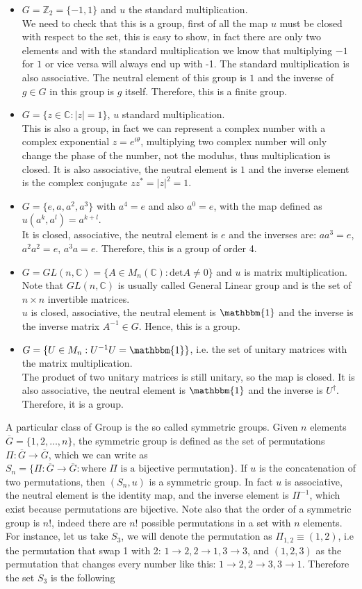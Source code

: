 \documentclass[12pt]{book}
\theoremstyle{plain}
\newcommand{\I}{\mathbbm{1}}
\newcommand{\Z}{\mathbb{Z}}
\newcommand{\C}{\mathbb{C}}
\theoremstyle{definition}
\theoremstyle{remark}
\begin{document}
\begin{itemize}
\item $G = \Z_2 = \{-1,1\}$ and $u$ the standard multiplication.\\
 We need to check that this is a group, first of all the map $u$ must be closed with respect to the set, this is easy to show, in fact there are only two elements and with the standard multiplication we know that multiplying $-1$ for $1$ or vice versa will always end up with -1. The standard multiplication is also associative. The neutral element of this group is $1$ and the inverse of $g\in G$ in this group is $g$ itself. Therefore, this is a finite group.
\item $G = \{z\in \C : |z|=1\}$, $u$ standard multiplication.\\
This is also a group, in fact we can represent a complex number with a complex exponential $z=e^{i\theta}$, multiplying two complex number will only change the phase of the number, not the modulus, thus multiplication is closed. It is also associative, the neutral element is $1$ and the inverse element is the complex conjugate $zz^* = |z|^2 = 1$.
\item $G = \{e,a,a^2,a^3\}$ with $a^4=e$ and also $a^0=e$, with the map defined as $u(a^k,a^l) = a^{k+l}$.\\
It is closed, associative, the neutral element is $e$ and the inverses are: $aa^3 = e$, $a^2a^2=e$, $a^3a=e$. Therefore, this is a group of order 4.
\item $G = GL(n,\C) = \{A\in M_n(\C): \text{det}A\neq 0\}$ and $u$ is matrix multiplication. Note that $GL(n,\C)$ is usually called General Linear group and is the set of $n\times n$ invertible matrices.\\
$u$ is closed, associative, the neutral element is $\mathbbm{1}$ and the inverse is the inverse matrix $A^{-1}\in G$. Hence, this is a group.
\item $G = \{U\in M_n : U^{-1}U = \I\}$, i.e. the set of unitary matrices with the matrix multiplication.\\
The product of two unitary matrices is still unitary, so the map is closed. It is also associative, the neutral element is $\I$ and the inverse is $U^\dagger$. Therefore, it is a group.
\end{itemize}
A particular class of Group is the so called symmetric groups. Given $n$ elements $\overline{G}=\{1,2,\dots,n\}$, the symmetric group is defined as the set of permutations $\Pi:\overline{G}\to \overline{G}$, which we can write as $S_n = \{\Pi:\overline{G}\to \overline{G}: \text{where } \Pi \text{ is a bijective permutation}\}$. If $u$ is the concatenation of two permutations, then $(S_n,u)$ is a symmetric group. In fact $u$ is associative, the neutral element is the identity map, and the inverse element is $\Pi^{-1}$, which exist because permutations are bijective. Note also that the order of a symmetric group is $n!$, indeed there are $n!$ possible permutations in a set with $n$ elements. For instance, let us take $S_3$, we will denote the permutation as $\Pi_{1,2}\equiv (1,2)$, i.e the permutation that swap 1 with 2: $1\to 2,2\to 1,3\to3$, and $(1,2,3)$ as the permutation that changes every number like this: $1\to2,2\to3,3\to1$. Therefore the set $S_3$ is the following
\end{document}
